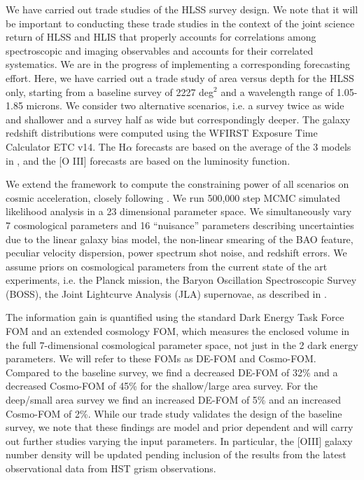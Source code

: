  We have carried out trade studies of the HLSS survey design. We note that it
 will be important to conducting these trade studies in the context of the joint
 science return of HLSS and HLIS that properly accounts for correlations among
 spectroscopic and imaging observables and accounts for their correlated
 systematics.  We are in the progress of implementing a corresponding forecasting
 effort.  Here, we have carried out a trade study of area versus depth for the
 HLSS only, starting from a baseline survey of 2227 deg$^2$ and a wavelength
 range of 1.05-1.85 microns. We consider two alternative scenarios, i.e. a survey
 twice as wide and shallower and a survey half as wide but correspondingly
 deeper.  The galaxy redshift distributions were computed using the WFIRST
 Exposure Time Calculator ETC v14. The H$\alpha$ forecasts are based on the average
 of the 3 models in \citet{Pozzetti:2016}, and the [O III] forecasts are based
 on the \citet{Mehta:2015} luminosity function.

 We extend the \CoLi framework \citep{Eifler2014b,Krause2016} to compute the constraining power of all scenarios on cosmic acceleration, closely following \citet{Wang2013}. We run 500,000 step
 MCMC simulated likelihood analysis in a 23 dimensional parameter space. We
 simultaneously vary 7 cosmological parameters and 16 ``nuisance'' parameters
 describing uncertainties due to the linear galaxy bias model, the non-linear
 smearing of the BAO feature, peculiar velocity dispersion, power spectrum shot
 noise, and redshift errors. We assume priors on cosmological parameters from the
 current state of the art experiments, i.e. the Planck mission, the Baryon
 Oscillation Spectroscopic Survey (BOSS), the Joint Lightcurve Analysis (JLA)
 supernovae, as described in \citet{Aubourg:2015}.

 The information gain is quantified using the standard Dark Energy Task Force FOM
 and an extended cosmology FOM, which measures the enclosed volume in the full
 7-dimensional cosmological parameter space, not just in the 2 dark energy
 parameters. We will refer to these FOMs as DE-FOM and Cosmo-FOM.  Compared to
 the baseline survey, we find a decreased DE-FOM of 32\% and a decreased
 Cosmo-FOM of 45\% for the shallow/large area survey. For the deep/small area
 survey we find an increased DE-FOM of 5\% and an increased Cosmo-FOM of 2\%.
 While our trade study validates the design of the baseline survey, we note that
 these findings are model and prior dependent and will carry out further studies
 varying the input parameters. In particular, the [OIII] galaxy number density
 will be updated pending inclusion of the results from the latest observational
 data from HST grism observations.

